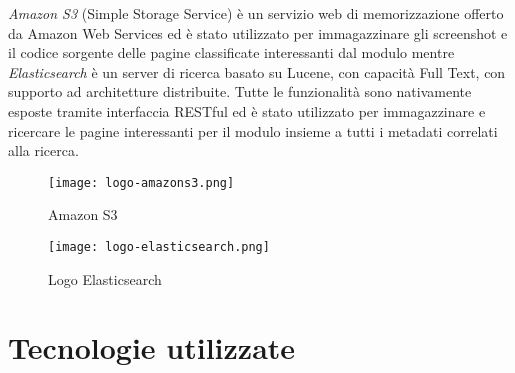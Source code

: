 \textit{Amazon S3} (Simple Storage Service) è un servizio web di memorizzazione offerto da Amazon Web Services ed è stato utilizzato per immagazzinare gli screenshot e il codice sorgente delle pagine classificate interessanti dal modulo mentre \textit{Elasticsearch} è un server di ricerca basato su Lucene, con capacità Full Text, con supporto ad architetture distribuite. Tutte le funzionalità sono nativamente esposte tramite interfaccia RESTful ed è stato utilizzato per immagazzinare e ricercare le pagine interessanti per il modulo insieme a tutti i metadati correlati alla ricerca.
\begin{figure}[!h]
    \begin{minipage}{.5\textwidth} 
        \centering 
        \texttt{[image: logo-amazons3.png]} 
        \caption{Amazon S3} 
        \label{fig:amazons3} 
    \end{minipage}%
    \begin{minipage}{.5\textwidth} 
        \centering 
        \texttt{[image: logo-elasticsearch.png]} 
        \caption{Logo Elasticsearch} 
        \label{fig:elasticsearch} 
    \end{minipage}%
\end{figure} 

\section{Tecnologie utilizzate}

